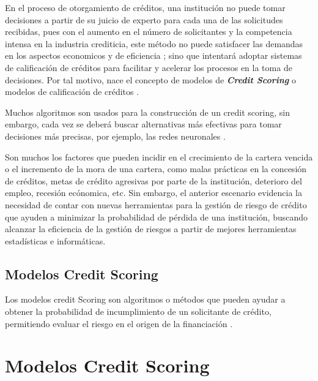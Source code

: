 \documentclass[
  letterpaper,
]{tex/svmono}
\begin{document}
\markright{}

En el proceso de otorgamiento de créditos, una institución no puede
tomar decisiones a partir de su juicio de experto para cada una de las
solicitudes recibidas, pues con el aumento en el número de solicitantes
y la competencia intensa en la industria crediticia, este método no
puede satisfacer las demandas en los aspectos economicos y de eficiencia
\citep{Yu}; sino que intentará adoptar sistemas de calificación de
créditos para facilitar y acelerar los procesos en la toma de
decisiones. Por tal motivo, nace el concepto de modelos de
\textbf{\emph{Credit Scoring}} o modelos de calificación de créditos
\citep{Islam}.

Muchos algoritmos son usados para la construcción de un credit scoring,
sin embargo, cada vez se deberá buscar alternativas más efectivas para
tomar decisiones más precisas, por ejemplo, las redes neuronales
\citep{Islam}.

Son muchos los factores que pueden incidir en el crecimiento de la
cartera vencida o el incremento de la mora de una cartera, como malas
prácticas en la concesión de créditos, metas de crédito agresivas por
parte de la institución, deterioro del empleo, recesión ecónomica, etc.
Sin embargo, el anterior escenario evidencia la necesidad de contar con
nuevas herramientas para la gestión de riesgo de crédito que ayuden a
minimizar la probabilidad de pérdida de una institución, buscando
alcanzar la eficiencia de la gestión de riesgos a partir de mejores
herramientas estadísticas e informáticas.

\hypertarget{modelos-credit-scoring}{%
\section*{Modelos Credit Scoring}\label{modelos-credit-scoring}}


Los modelos credit Scoring son algoritmos o métodos que pueden ayudar a
obtener la probabilidad de incumplimiento de un solicitante de crédito,
permitiendo evaluar el riesgo en el origen de la financiación
\citep{Gutierrez}.


\hypertarget{modelos-credit-scoring-1}{%
\chapter{Modelos Credit Scoring}\label{modelos-credit-scoring-1}}
\end{document}
